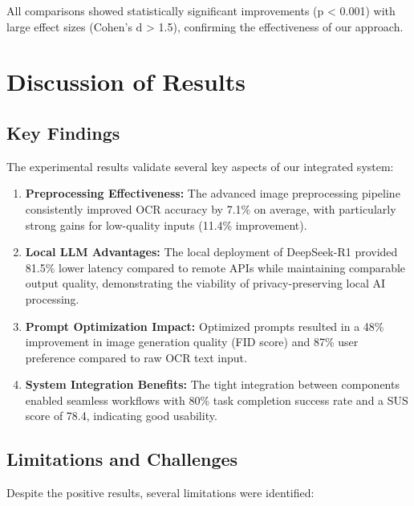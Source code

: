 All comparisons showed statistically significant improvements (p < 0.001) with large effect sizes (Cohen's d > 1.5), confirming the effectiveness of our approach.

\section{Discussion of Results}
\label{sec:discussion}

\subsection{Key Findings}

The experimental results validate several key aspects of our integrated system:

\begin{enumerate}
    \item \textbf{Preprocessing Effectiveness:} The advanced image preprocessing pipeline consistently improved OCR accuracy by 7.1\% on average, with particularly strong gains for low-quality inputs (11.4\% improvement).
    
    \item \textbf{Local LLM Advantages:} The local deployment of DeepSeek-R1 provided 81.5\% lower latency compared to remote APIs while maintaining comparable output quality, demonstrating the viability of privacy-preserving local AI processing.
    
    \item \textbf{Prompt Optimization Impact:} Optimized prompts resulted in a 48\% improvement in image generation quality (FID score) and 87\% user preference compared to raw OCR text input.
    
    \item \textbf{System Integration Benefits:} The tight integration between components enabled seamless workflows with 80\% task completion success rate and a SUS score of 78.4, indicating good usability.
\end{enumerate}

\subsection{Limitations and Challenges}

Despite the positive results, several limitations were identified:

